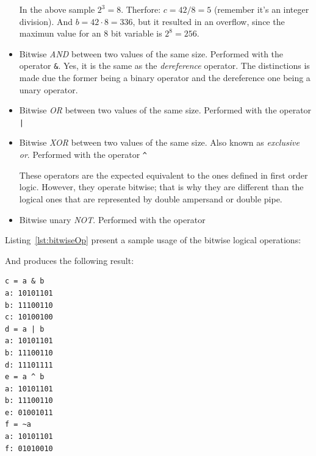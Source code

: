 \begin{itemize}
In the above sample $2^3 = 8$. Therfore: $c = 42 / 8 = 5$ (remember it's an integer division).
And $b = 42 \cdot 8 = 336$, but it resulted in an overflow, since the maximun value for an $8$ bit variable is $2^8 = 256$.

\item Bitwise \emph{AND} between two values of the same size. Performed with the operator \texttt{&}. Yes, it is the same as the \emph{dereference} operator. The distinctions is made due the former being a binary operator and the dereference one being a unary operator.
\item Bitwise \emph{OR} between two values of the same size. Performed with the operator \texttt{|}
\item Bitwise \emph{XOR} between two values of the same size. Also known as \emph{exclusive or}. Performed with the operator \texttt{^}

These operators are the expected equivalent to the ones defined in first order logic.
However, they operate bitwise; that is why they are different than the logical ones that are represented by double ampersand or double pipe.

\item Bitwise unary \emph{NOT}. Performed with the operator \texttt{~}
\end{itemize}

Listing~\ref{lst:bitwiseOp} present a sample usage of the bitwise logical operations:

{\centering
\begin{minipage}{\linewidth}
\end{minipage}
\par
}

And produces the following result:

\begin{verbatim}
c = a & b
a: 10101101
b: 11100110
c: 10100100
d = a | b
a: 10101101
b: 11100110
d: 11101111
e = a ^ b
a: 10101101
b: 11100110
e: 01001011
f = ~a
a: 10101101
f: 01010010
\end{verbatim}

